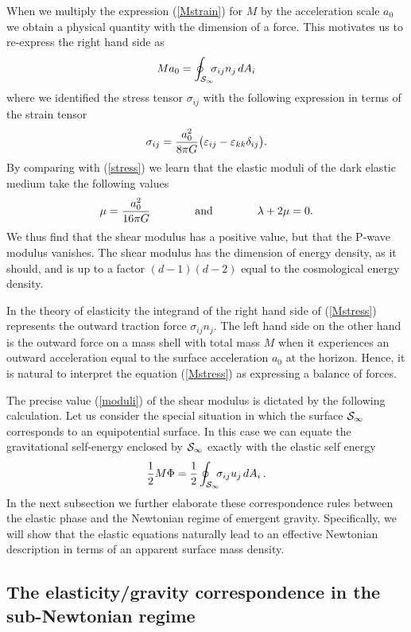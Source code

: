 \documentclass[a4paper,12pt]{article}
\newcommand{\be}{\begin{equation}}
\newcommand{\ee}{\end{equation}}
\begin{document}
When we multiply the expression (\ref{Mstrain}) for    $M$ by the acceleration scale $a_0$ we obtain a physical quantity with the dimension of a force.  This motivates us to re-express the right hand side as 
\be
\label{Mstress}
M a_0 = \oint_{{\cal S}_{\infty}} \!\!\!\sigma_{ij} n_{j\,} dA_i
\ee
where we identified the stress tensor $\sigma_{ij}$ with the following expression in terms of the strain tensor 
\be
\label{sigmadef}
\sigma_{ij}  = {a_0^2\over 8\pi G}\bigl(\varepsilon_{ij}- \varepsilon_{kk}\delta_{ij}\bigr) .
\ee
By comparing with (\ref{stress}) we learn that the  elastic moduli of the dark elastic medium   take the following values
\be
\label{moduli}
\mu =  {a_0^2\over 16\pi G} \qquad \qquad \mbox{and}\qquad \qquad \lambda +2\mu = 0 .
\ee
We thus find that the shear modulus has a positive value, but that the P-wave modulus vanishes. 
The shear modulus has the dimension of energy density, as it should, and is up to a factor $
(d-1)(d-2)$ equal to the cosmological energy density.  

In the theory of elasticity the integrand of the right hand side of (\ref{Mstress}) represents the outward traction force $\sigma_{ij}n_j$. The left hand side on the other hand is the outward force on a mass shell with total mass $M$   when it experiences an outward acceleration equal to the surface acceleration $a_0$ at the horizon.  Hence,  it is natural to interpret the equation (\ref{Mstress}) as expressing a balance of forces. 

The precise value (\ref{moduli}) of the shear modulus is dictated by the following calculation. Let us consider the special situation in which the surface ${\cal S}_\infty$ corresponds to an equipotential surface. In this case we can equate the gravitational self-energy  enclosed by ${\cal S}_\infty$ exactly with the elastic self energy
\begin{equation}
{1\over 2} M\Phi = {1\over 2}	\oint_{{\cal S}_{\infty}} \!\!\!\sigma_{ij} u_{j\,} dA_i  \, .
\end{equation}
 In the next subsection we further elaborate these correspondence rules between the elastic phase  and the Newtonian regime of emergent gravity. Specifically, we will show that the elastic equations naturally lead to an effective Newtonian description in terms of an apparent surface mass density.  






\subsection{The elasticity/gravity correspondence in the sub-Newtonian regime}
\end{document}
